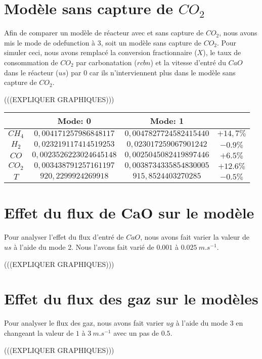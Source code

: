 \documentclass[11pt]{report}
\begin{document}
        \section{Modèle sans capture de $CO_2$}
            Afin de comparer un modèle de réacteur avec et sans capture de $CO_2$,
            nous avons mis le mode de odefunction à 3, soit un modèle sans capture de $CO_2$.
            Pour simuler ceci, nous avons remplacé la conversion fractionnaire ($X$),
            le taux de consommation de $CO_2$ par carbonatation ($rcbn$)
            et la vitesse d'entré du $CaO$ dans le réacteur ($us$)
            par $0$ car ils n'interviennent plus dans le modèle sans capture de $CO_2$.
            \par
            (((EXPLIQUER GRAPHIQUES)))

            \begin{tabular}{|c|c|c|c|}
                \hline
                & Mode: 0 & Mode: 1 & \\
                \hline
                $CH_4$ & $0,004171257986848117$ & $0,0047827724582415440$ & $+14,7\%$\\
                $H_2$ & $0,023219117414519253$ & $0,023017259067901242$ & $-0.9\%$\\
                $CO$ & $0,0023526223024645148$ & $0,0025045082419897446$ & $+6.5\%$\\
                $CO_2$ & $0,003438791257161197$ & $0,0038734335854830005$ & $+12.6\%$\\
                $T$ & $920,2299924269918$ & $915,8524403270285$ & $-0.5\%$\\
                \hline
            \end{tabular}

        \section{Effet du flux de CaO sur le modèle}
            Pour analyser l'effet du flux d'entré de $CaO$,
            nous avons fait varier la valeur de $us$ à l'aide du mode 2.
            Nous l'avons fait varié de $0.001$ à $0.025\ m.s^{-1}$.
            \par
            (((EXPLIQUER GRAPHIQUES)))
        
        \section{Effet du flux des gaz sur le modèles}
            Pour analyser le flux des gaz, nous avons fait varier $ug$ à l'aide du mode 3
            en changeant la valeur de $1$ à $3\ m.s^{-1}$ avec un pas de $0.5$.
            \par
            (((EXPLIQUER GRAPHIQUES)))
        
\end{document}
